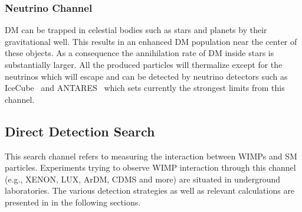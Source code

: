 \subsubsection{Neutrino Channel}

DM can be trapped in celestial bodies such as stars and planets by their gravitational well. This results in an enhanced DM population near the center of these objects. As a consequence the annihilation rate of DM inside stars is substantially larger. All the produced particles will thermalize except for the neutrinos which will escape and can be detected by neutrino detectors such as IceCube~\cite{Achterberg:2006md} and ANTARES~\cite{Collaboration:2011nsa} which sets currently the strongest limits from this channel.

\subsection{Direct Detection Search}
\label{subsec:directdetection}

This search channel refers to measuring the interaction between WIMPs and SM particles. Experiments trying to observe WIMP interaction through this channel (e.g., XENON, LUX, ArDM, CDMS and more) are situated in underground laboratories. The various detection strategies as well as relevant calculations are presented in in the following sections.

